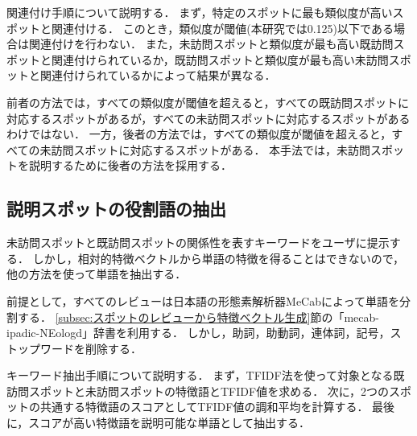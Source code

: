 \documentclass[submit,techrep,noauthor]{ipsj}
\begin{document}
関連付け手順について説明する．
まず，特定のスポットに最も類似度が高いスポットと関連付ける．
このとき，類似度が閾値(本研究では0.125)以下である場合は関連付けを行わない．
また，未訪問スポットと類似度が最も高い既訪問スポットと関連付けられているか，既訪問スポットと類似度が最も高い未訪問スポットと関連付けられているかによって結果が異なる．

前者の方法では，すべての類似度が閾値を超えると，すべての既訪問スポットに対応するスポットがあるが，すべての未訪問スポットに対応するスポットがあるわけではない．
一方，後者の方法では，すべての類似度が閾値を超えると，すべての未訪問スポットに対応するスポットがある．
本手法では，未訪問スポットを説明するために後者の方法を採用する．

\subsection{説明スポットの役割語の抽出}
\label{subsec:説明するための役割語の抽出}
未訪問スポットと既訪問スポットの関係性を表すキーワードをユーザに提示する．
しかし，相対的特徴ベクトルから単語の特徴を得ることはできないので，他の方法を使って単語を抽出する．

前提として，すべてのレビューは日本語の形態素解析器MeCabによって単語を分割する．
\ref{subsec:スポットのレビューから特徴ベクトル生成}節の「mecab-ipadic-NEologd」辞書を利用する．
しかし，助詞，助動詞，連体詞，記号，ストップワードを削除する．

キーワード抽出手順について説明する．
まず，TFIDF法を使って対象となる既訪問スポットと未訪問スポットの特徴語とTFIDF値を求める．
次に，2つのスポットの共通する特徴語のスコアとしてTFIDF値の調和平均を計算する．
最後に，スコアが高い特徴語を説明可能な単語として抽出する．

%
\end{document}
